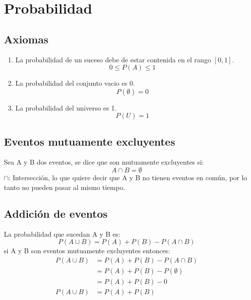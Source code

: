 \section{Probabilidad}
\subsection{Axiomas}
\begin{enumerate}
    \item La probabilidad de un suceso debe de estar contenida en el rango $[0,1]$.
          \begin{equation*}
              0 \leq P(A)\leq 1
          \end{equation*}
    \item La probabilidad del conjunto vacio es 0.
          \begin{equation*}
              P(\emptyset)=0
          \end{equation*}
    \item La probabilidad del universo es 1.
          \begin{equation*}
              P(U)=1
          \end{equation*}
\end{enumerate}
\subsection{Eventos mutuamente excluyentes}
\begin{definicion}
    Sea A y B dos eventos, se dice que son mutuamente excluyentes si:
    \begin{equation*}
        A \cap B = \emptyset
    \end{equation*}
    $\cap$: Intersección, lo que quiere decir que A y B no tienen eventos en común, por lo tanto no pueden pasar al mismo tiempo.
\end{definicion}
\subsection{Addición de eventos}
La probabilidad que sucedan A y B es:
\begin{equation*}
    P(A\cup B) = P(A)+P(B) - P(A\cap B)
\end{equation*}
si A y B son eventos mutuamente excluyentes entonces:
\begin{align*}
    P(A\cup B) & = P(A)+P(B) - P(A\cap B) \\
               & =P(A)+P(B)-P(\emptyset)  \\
               & = P(A)+P(B)-0            \\
    P(A\cup B) & = P(A)+P(B)
\end{align*}
